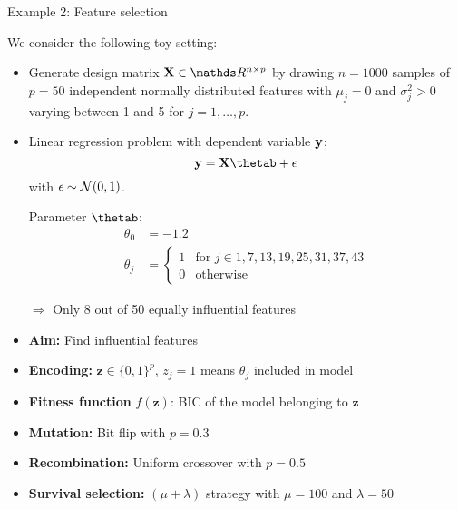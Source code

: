\documentclass[11pt,compress,t,notes=noshow, xcolor=table]{beamer}
\begin{document}
\begin{vbframe}{Example 2: Feature selection}

We consider the following toy setting:

\begin{itemize}
\item Generate design matrix $\Xmat \in \R^{n \times p}$ by drawing $n = 1000$ samples of $p = 50$ independent normally distributed features with $\mu_j = 0$ and $\sigma_j^2 > 0$ varying between 1 and 5 for $j = 1, \dots, p$.
\item Linear regression problem with dependent variable $\mathbf{y}$:
$$
    \yv = \Xmat \thetab + \eps
$$
with $\epsilon \sim \mathcal N(0, 1)$.

\medskip

Parameter $\thetab$:
\begin{align*}
    \theta_0 &= - 1.2 \\
    \theta_j &= \begin{cases}
        1 & \text{for $j \in {1, 7, 13, 19, 25, 31, 37, 43}$} \\
        0 & \text{otherwise}
    \end{cases}
\end{align*}

$\Rightarrow$ Only 8 out of 50 equally influential features
 

\end{itemize}

\framebreak

\begin{itemize}
    \item \textbf{Aim:} Find influential features
    \item \textbf{Encoding:} $\textbf{z} \in \{0, 1\}^p$, $z_j = 1$ means $\theta_j$ included in model
    \item \textbf{Fitness function} $f(\mathbf{z})$: BIC of the model belonging to $\mathbf{z}$
    \item \textbf{Mutation:} Bit flip with $p = 0.3$
    \item \textbf{Recombination:} Uniform crossover with $p=0.5$
    \item \textbf{Survival selection:} $(\mu + \lambda)$ strategy with $\mu = 100$ and $\lambda =50$
\end{itemize}


\end{vbframe}
\end{document}
